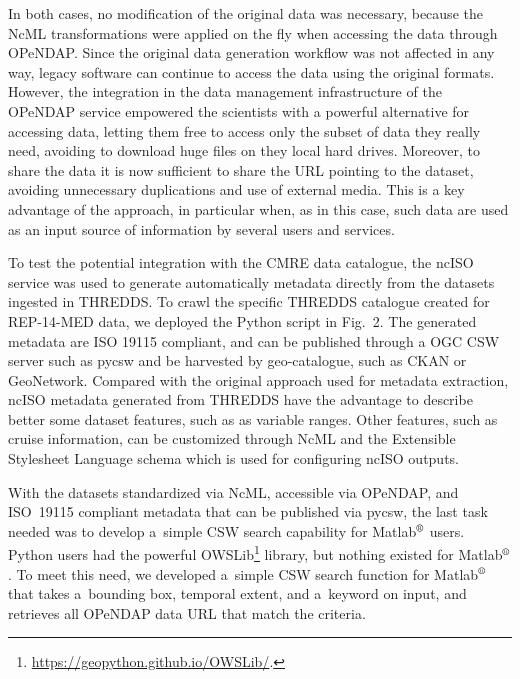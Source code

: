 \documentclass[osd, online, hvmath]{copernicus}
\begin{document}
In both cases, no modification of the original data was necessary, because the NcML transformations were applied on the fly when accessing the data through OPeNDAP. Since the original data generation workflow was not affected in any way, legacy software can continue to access the data using the original formats. However, the integration in the data management infrastructure of the OPeNDAP service empowered the scientists with a powerful alternative for accessing data, letting them free to access only the subset of data they really need, avoiding to download huge files on they local hard drives. Moreover, to share the data it is now sufficient to share the URL pointing to the dataset, avoiding unnecessary duplications and use of external media. This is a key advantage of the approach, in particular when, as in this case, such data are used as an input source of information by several users and services.

To test the potential integration with the CMRE data catalogue, the ncISO service was used to generate automatically metadata directly from the datasets ingested in THREDDS. To crawl the specific THREDDS catalogue created for REP-14-MED data, we deployed the Python script in Fig.~2. The generated metadata are ISO 19115 compliant, and can be published through a OGC CSW server such as pycsw and be harvested by geo-catalogue, such as CKAN or GeoNetwork. 
Compared with the original approach used for metadata extraction, ncISO metadata generated from THREDDS have the advantage to describe better some dataset features, such as as variable ranges. Other features, such as cruise information, can be customized through NcML and the Extensible Stylesheet Language schema which is used for configuring ncISO outputs. 

With the datasets standardized via NcML, accessible via OPeNDAP, and ISO~19115 compliant metadata that can be published via pycsw, the
last task needed was to develop a~simple CSW search capability for Matlab$^{\text{\textregistered}}$ users. Python users had the powerful
OWSLib\footnote{\url{https://geopython.github.io/OWSLib/}.} library, but nothing existed for Matlab$^{\text{\textregistered}}$. To meet
this need, we developed a~simple CSW search function for Matlab$^{\text{\textregistered}}$ that takes a~bounding box, temporal extent, and a~keyword on input, and retrieves all OPeNDAP data URL that match the criteria.
\end{document}
